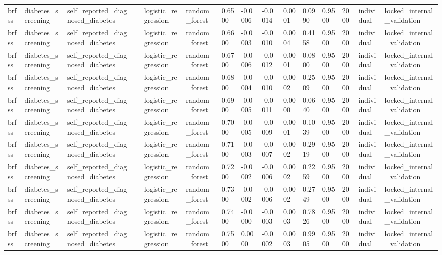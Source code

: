 \begin{tabular}{lllllllllllllll}
brfss & diabetes\_screening & self\_reported\_diagnosed\_diabetes &  & logistic\_regression & random\_forest & 0.6500 & -0.0006 & -0.0014 & 0.0001 & 0.0990 & 0.9500 & 2000 & individual & locked\_internal\_validation \\
brfss & diabetes\_screening & self\_reported\_diagnosed\_diabetes &  & logistic\_regression & random\_forest & 0.6600 & -0.0003 & -0.0010 & 0.0004 & 0.4158 & 0.9500 & 2000 & individual & locked\_internal\_validation \\
brfss & diabetes\_screening & self\_reported\_diagnosed\_diabetes &  & logistic\_regression & random\_forest & 0.6700 & -0.0006 & -0.0012 & 0.0001 & 0.0800 & 0.9500 & 2000 & individual & locked\_internal\_validation \\
brfss & diabetes\_screening & self\_reported\_diagnosed\_diabetes &  & logistic\_regression & random\_forest & 0.6800 & -0.0004 & -0.0010 & 0.0002 & 0.2509 & 0.9500 & 2000 & individual & locked\_internal\_validation \\
brfss & diabetes\_screening & self\_reported\_diagnosed\_diabetes &  & logistic\_regression & random\_forest & 0.6900 & -0.0005 & -0.0011 & 0.0000 & 0.0640 & 0.9500 & 2000 & individual & locked\_internal\_validation \\
brfss & diabetes\_screening & self\_reported\_diagnosed\_diabetes &  & logistic\_regression & random\_forest & 0.7000 & -0.0005 & -0.0009 & 0.0001 & 0.1039 & 0.9500 & 2000 & individual & locked\_internal\_validation \\
brfss & diabetes\_screening & self\_reported\_diagnosed\_diabetes &  & logistic\_regression & random\_forest & 0.7100 & -0.0003 & -0.0007 & 0.0002 & 0.2919 & 0.9500 & 2000 & individual & locked\_internal\_validation \\
brfss & diabetes\_screening & self\_reported\_diagnosed\_diabetes &  & logistic\_regression & random\_forest & 0.7200 & -0.0002 & -0.0006 & 0.0002 & 0.2259 & 0.9500 & 2000 & individual & locked\_internal\_validation \\
brfss & diabetes\_screening & self\_reported\_diagnosed\_diabetes &  & logistic\_regression & random\_forest & 0.7300 & -0.0002 & -0.0006 & 0.0002 & 0.2749 & 0.9500 & 2000 & individual & locked\_internal\_validation \\
brfss & diabetes\_screening & self\_reported\_diagnosed\_diabetes &  & logistic\_regression & random\_forest & 0.7400 & -0.0000 & -0.0003 & 0.0003 & 0.7826 & 0.9500 & 2000 & individual & locked\_internal\_validation \\
brfss & diabetes\_screening & self\_reported\_diagnosed\_diabetes &  & logistic\_regression & random\_forest & 0.7500 & 0.0000 & -0.0002 & 0.0003 & 0.9905 & 0.9500 & 2000 & individual & locked\_internal\_validation \\

\end{tabular}
